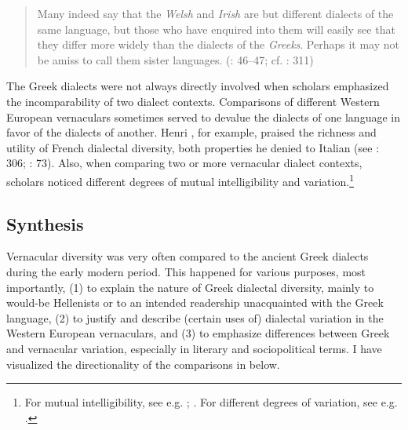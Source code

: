 \begin{quote}
Many indeed say that the \textit{Welsh} and \textit{Irish} are but different dialects of the same language, but those who have enquired into them will easily see that they differ more widely than the dialects of the \textit{Greeks}. Perhaps it may not be amiss to call them sister languages. (\citealt{Malcolm1738}: 46–47; cf. \citealt{Macnicol1779}: 311)
\end{quote}

The Greek dialects were not always directly involved when scholars emphasized the incomparability of two dialect contexts. Comparisons of different Western European vernaculars sometimes served to devalue the dialects of one language in favor of the dialects of another. Henri \citet[133--134]{Estienne1579}, for example, praised the richness and utility of French dialectal diversity, both properties he denied to Italian (see \citealt{Swiggers1997}: 306; \citeyear{Swiggers2009}: 73). Also, when comparing two or more vernacular dialect contexts, scholars noticed different degrees of mutual intelligibility and variation.\footnote{For mutual intelligibility, see e.g. \citet[158\textsc{\textsuperscript{r}}\textsc{–158}\textsc{\textsuperscript{v}}]{Hosius1560}; \citet[77 – I refer to the German translation of the Swedish original, published in 1746/1747]{Hogstrom1748}. For different degrees of variation, see e.g. \citet[27, 57]{Sajnovics1770}.}

\subsection{Synthesis}

Vernacular diversity was very often compared to the ancient Greek dialects during the early modern period. This happened for various purposes, most importantly, (1) to explain the nature of Greek dialectal diversity, mainly to would-be Hellenists or to an intended readership unacquainted with the Greek language, (2) to justify and describe (certain uses of) dialectal variation in the Western European vernaculars, and (3) to emphasize differences between Greek and vernacular variation, especially in literary and sociopolitical terms. I have visualized the directionality of the comparisons in  below.

